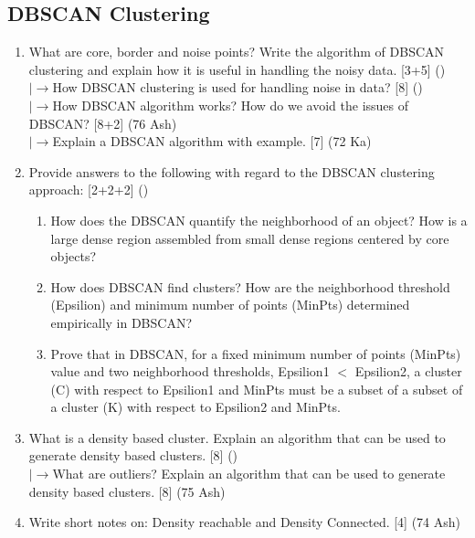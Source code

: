 \documentclass[12pt]{article}
\newcommand{\lb}{\\$\left|\rightarrow\right.$}
\begin{document}
  \subsection{DBSCAN Clustering}
    \begin{enumerate}[topsep=0pt, noitemsep]
      \item What are core, border and noise points? Write the algorithm of DBSCAN clustering and explain how it is useful in handling the noisy data. \hfill [3+5] ()
        \lb How DBSCAN clustering is used for handling noise in data? \hfill [8] ()
        \lb How DBSCAN algorithm works? How do we avoid the issues of DBSCAN? \hfill [8+2] (76 Ash)
        \lb Explain a DBSCAN algorithm with example. \hfill [7] (72 Ka)

      \item Provide answers to the following with regard to the DBSCAN clustering approach: \hfill [2+2+2] ()
        \begin{enumerate}[label=\alph*),topsep=2pt,noitemsep]
          \item How does the DBSCAN quantify the neighborhood of an object? How is a large dense region assembled from small dense regions centered by core objects?
          \item How does DBSCAN find clusters? How are the neighborhood threshold (Epsilion) and minimum number of points (MinPts) determined empirically in DBSCAN?
          \item Prove that in DBSCAN, for a fixed minimum number of points (MinPts) value and two neighborhood thresholds, Epsilion1 $<$ Epsilion2, a cluster (C) with respect to Epsilion1 and MinPts must be a subset of a subset of a cluster (K) with respect to Epsilion2 and MinPts.
        \end{enumerate}

      \item What is a density based cluster. Explain an algorithm that can be used to generate density based clusters. \hfill [8] ()
        \lb What are outliers? Explain an algorithm that can be used to generate density based clusters. \hfill [8] (75 Ash)

      \item Write short notes on: Density reachable and Density Connected. \hfill [4] (74 Ash)
    \end{enumerate}
\end{document}
